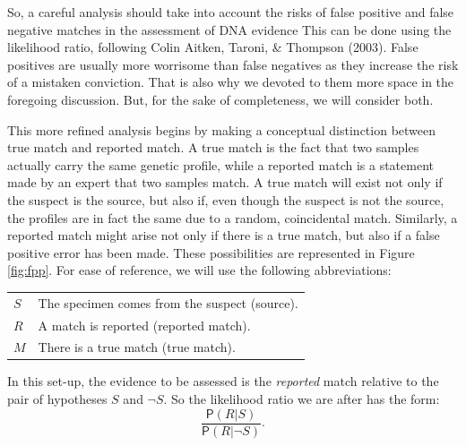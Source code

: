 \documentclass[
  10pt,
  dvipsnames,enabledeprecatedfontcommands]{scrartcl}
\newcommand{\pr}[1]{\mathsf{P}(#1)}
\begin{document}
So, a careful analysis should take into account the risks of false
positive and false negative matches in the assessment of DNA evidence
This can be done using the likelihood ratio, following Colin Aitken,
Taroni, \& Thompson (2003). False positives are usually more worrisome
than false negatives as they increase the risk of a mistaken conviction.
That is also why we devoted to them more space in the foregoing
discussion. But, for the sake of completeness, we will consider both.

This more refined analysis begins by making a conceptual distinction
between true match and reported match. A true match is the fact that two
samples actually carry the same genetic profile, while a reported match
is a statement made by an expert that two samples match. A true match
will exist not only if the suspect is the source, but also if, even
though the suspect is not the source, the profiles are in fact the same
due to a random, coincidental match. Similarly, a reported match might
arise not only if there is a true match, but also if a false positive
error has been made. These possibilities are represented in Figure
\ref{fig:fpp}. For ease of reference, we will use the following
abbreviations:

\begin{center} \hspace{10mm}
\begin{tabular}{lp{9cm}}
$S$ & The specimen comes from the suspect (source). \\
$R$ & A match is reported (reported match). \\
$M$ & There is a true match (true match).
\end{tabular}
\end{center}

\noindent  In this set-up, the evidence to be assessed is the
\textit{reported} match relative to the pair of hypotheses \(S\) and
\(\neg S\). So the likelihood ratio we are after has the form:
\[\frac{\pr{R \vert S}}{\pr{R \vert \neg S}}.\]
\end{document}
